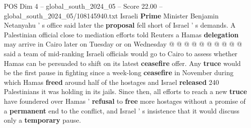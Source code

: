 \begin{textsample}{POS Dim 4 – global\_south\_2024\_05 – Score 22.00 – global\_south\_2024\_05/108145940.txt}
Israeli \textbf{Prime} Minister Benjamin Netanyahu ' s office said later the \textbf{proposal} fell short of Israel ' s demands.
A Palestinian official close to mediation efforts told Reuters a Hamas \textbf{delegation} may arrive in Cairo later on Tuesday or on Wednesday @ @ @ @ @ @ @ @ @ @ said a team of mid-ranking Israeli officials would go to Cairo to assess whether Hamas can be persuaded to shift on its latest \textbf{ceasefire} offer.
Any \textbf{truce} would be the first pause in fighting since a week-long \textbf{ceasefire} in November during which Hamas \textbf{freed} around half of the hostages and Israel \textbf{released} 240 Palestinians it was holding in its jails.
Since then, all efforts to reach a new \textbf{truce} have foundered over Hamas ' \textbf{refusal} to \textbf{free} more hostages without a promise of a \textbf{permanent} end to the conflict, and Israel ' s insistence that it would discuss only a \textbf{temporary} pause.

\end{textsample}
